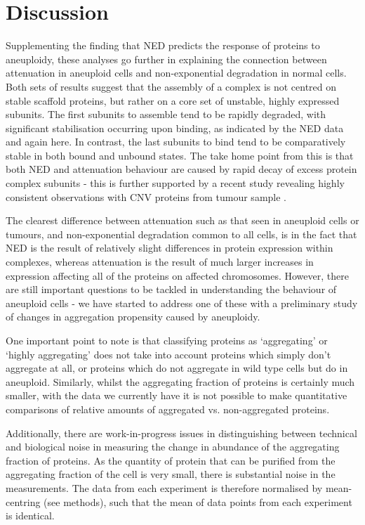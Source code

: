 \documentclass[a4paper,11pt,twoside,openright]{scrbook}
\begin{document}
\section{Discussion}
Supplementing the finding that NED predicts the response of proteins to aneuploidy, these analyses go further in explaining the connection between attenuation in aneuploid cells and non-exponential degradation in normal cells. Both sets of results suggest that the assembly of a complex is not centred on stable scaffold proteins, but rather on a core set of unstable, highly expressed subunits. The first subunits to assemble tend to be rapidly degraded, with significant stabilisation occurring upon binding, as indicated by the NED data and again here. In contrast, the last subunits to bind tend to be comparatively stable in both bound and unbound states. The take home point from this is that both NED and attenuation behaviour are caused by rapid decay of excess protein complex subunits - this is further supported by a recent study revealing highly consistent observations with CNV proteins from tumour sample \cite{Goncalves2017}.

The clearest difference between attenuation such as that seen in aneuploid cells or tumours, and non-exponential degradation common to all cells, is in the fact that NED is the result of relatively slight differences in protein expression within complexes, whereas attenuation is the result of much larger increases in expression affecting all of the proteins on affected chromosomes. However, there are still important questions to be tackled in understanding the behaviour of aneuploid cells - we have started to address one of these with a preliminary study of changes in aggregation propensity caused by aneuploidy.

One important point to note is that classifying proteins as `aggregating' or `highly aggregating' does not take into account proteins which simply don't aggregate at all, or proteins which do not aggregate in wild type cells but do in aneuploid. Similarly, whilst the aggregating fraction of proteins is certainly much smaller, with the data we currently have it is not possible to make quantitative comparisons of relative amounts of aggregated vs. non-aggregated proteins.

Additionally, there are work-in-progress issues in distinguishing between technical and biological noise in measuring the change in abundance of the aggregating fraction of proteins. As the quantity of protein that can be purified from the aggregating fraction of the cell is very small, there is substantial noise in the measurements. The data from each experiment is therefore normalised by mean-centring (see methods), such that the mean of data points from each experiment is identical.
\end{document}
